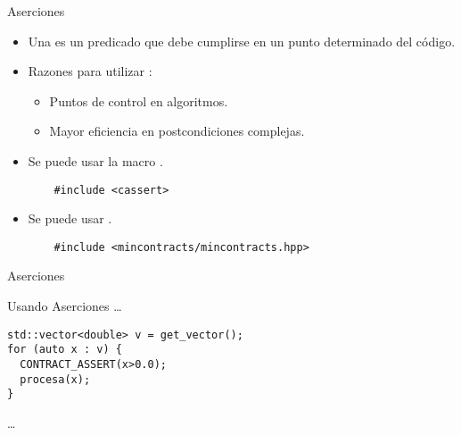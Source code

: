 \begin{frame}[t,fragile]{Aserciones}
\begin{itemize}
  \item Una  es un predicado que debe cumplirse
        en un punto determinado del código.

  \item Razones para utilizar :
    \begin{itemize}
      \item Puntos de control en algoritmos.
      \item Mayor eficiencia en postcondiciones complejas.
    \end{itemize}

  \item Se puede usar la macro .
    \begin{lstlisting}
    #include <cassert>
    \end{lstlisting}

  \item Se puede usar .
    \begin{lstlisting}
    #include <mincontracts/mincontracts.hpp>
    \end{lstlisting}
\end{itemize}
\end{frame}

\begin{frame}[t,fragile]{Aserciones}
\begin{block}{Usando Aserciones}
\ldots
\begin{lstlisting}
std::vector<double> v = get_vector();
for (auto x : v) {
  CONTRACT_ASSERT(x>0.0);
  procesa(x);
}
\end{lstlisting}
\ldots
\end{block}
\end{frame}
